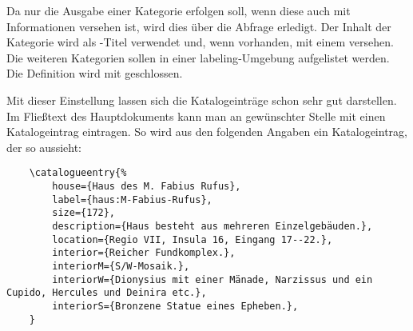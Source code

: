 Da nur die Ausgabe einer Kategorie erfolgen soll,
wenn diese auch mit Informationen versehen ist,
wird dies über die Abfrage  erledigt.
Der Inhalt der Kategorie  wird als -Titel verwendet und, wenn vorhanden, mit einem  versehen.
Die weiteren Kategorien sollen in einer {labeling}-Umgebung aufgelistet werden.
Die Definition wird mit  geschlossen.
\begin{lfgwcode}{label={lis:cat-2}}
...
\ifdef{\KVhouse}{\section{\KVhouse
  \ifdef{\KVlabel}{\label{\KVlabel}}{}}}{}
\begin{labeling}{Beschreibung}
  \ifdef{\KVdescription}{\item[Beschreibung] \KVdescription}{}
  \ifdef{\KVlocation}{\item[Verortung] \KVlocation}{}
  \ifdef{\KVsize}{\item[Größe] \SI{\KVsize}{\meter\squared}}{}
\end{labeling}
\endgroup
}
\end{lfgwcode}

Mit dieser Einstellung lassen sich die Katalogeinträge schon sehr gut darstellen.
Im Fließtext des Hauptdokuments kann man an gewünschter Stelle mit  einen Katalogeintrag eintragen.
So wird aus den folgenden Angaben ein Katalogeintrag, der so aussieht:
\begin{lstlisting}
    \catalogueentry{%
        house={Haus des M. Fabius Rufus},
        label={haus:M-Fabius-Rufus},
        size={172},
        description={Haus besteht aus mehreren Einzelgebäuden.},
        location={Regio VII, Insula 16, Eingang 17--22.},
        interior={Reicher Fundkomplex.},
        interiorM={S/W-Mosaik.},
        interiorW={Dionysius mit einer Mänade, Narzissus und ein Cupido, Hercules und Deinira etc.},
        interiorS={Bronzene Statue eines Epheben.},
    }
\end{lstlisting}


